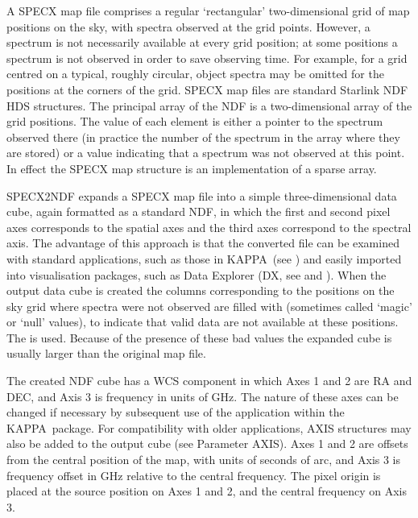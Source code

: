 \documentclass[twoside,11pt]{starlink}
\providecommand{\KAPPA}{{\footnotesize KAPPA}}
\begin{document}
{{      A SPECX map file comprises a regular `rectangular' two-dimensional
      grid of map positions on the sky, with spectra observed at the grid
      points.  However, a spectrum is not necessarily available at every
      grid position; at some positions a spectrum is not observed in
      order to save observing time.  For example, for a grid centred on
      a typical, roughly circular, object spectra may be omitted for the
      positions at the corners of the grid.  SPECX map files are standard
      Starlink NDF HDS structures.  The principal array of the NDF is a
      two-dimensional array of the grid positions.  The value of each
      element is either a pointer to the spectrum observed there (in
      practice the number of the spectrum in the array where they are
      stored) or a value indicating that a spectrum was not observed at
      this point.  In effect the SPECX map structure is an implementation
      of a sparse array.

      SPECX2NDF expands a SPECX map file into a simple three-dimensional
      data cube, again formatted as a standard NDF, in which the first
      and second pixel axes corresponds to the spatial axes and the third
      axes correspond to the spectral axis.  The advantage of
      this approach is that the converted file can be examined with
      standard applications, such as those in \KAPPA\ (see ) and
      easily imported into visualisation packages, such as Data Explorer
      (DX, see  and ).  When the
      output data cube is created
      the columns corresponding to the positions on the sky grid where
      spectra were not observed are filled with  (sometimes
      called `magic' or `null' values), to indicate that valid data are
      not available at these positions.  The 
      is used.  Because of the presence of these bad values the expanded
      cube is usually larger than the original map file.

      The created NDF cube has a WCS component in which Axes 1 and 2 are
      RA and DEC, and Axis 3 is frequency in units of GHz. The nature of
      these axes can be changed if necessary by subsequent use of the
       application within the \KAPPA\ package.
      For compatibility with older applications, AXIS structures may also
      be added to the output cube (see Parameter AXIS).  Axes 1 and 2 are
      offsets from the central position of the map,
      with units of seconds of arc, and Axis 3 is frequency offset in GHz
      relative to the central frequency.  The pixel origin is placed at the
      source position on Axes 1 and 2, and the central frequency on Axis 3.

}}
\end{document}
